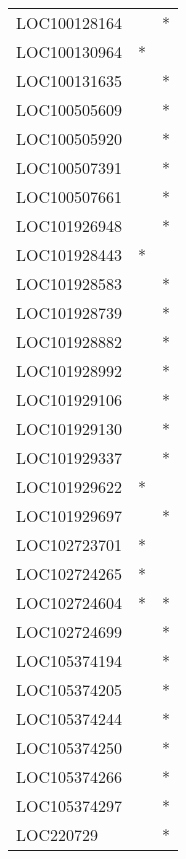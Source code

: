 \begin{longtable}{lcc}
LOC100128164     &                &          * \\
LOC100130964     &              * &            \\
LOC100131635     &                &          * \\
LOC100505609     &                &          * \\
LOC100505920     &                &          * \\
LOC100507391     &                &          * \\
LOC100507661     &                &          * \\
LOC101926948     &                &          * \\
LOC101928443     &              * &            \\
LOC101928583     &                &          * \\
LOC101928739     &                &          * \\
LOC101928882     &                &          * \\
LOC101928992     &                &          * \\
LOC101929106     &                &          * \\
LOC101929130     &                &          * \\
LOC101929337     &                &          * \\
LOC101929622     &              * &            \\
LOC101929697     &                &          * \\
LOC102723701     &              * &            \\
LOC102724265     &              * &            \\
LOC102724604     &              * &          * \\
LOC102724699     &                &          * \\
LOC105374194     &                &          * \\
LOC105374205     &                &          * \\
LOC105374244     &                &          * \\
LOC105374250     &                &          * \\
LOC105374266     &                &          * \\
LOC105374297     &                &          * \\
LOC220729        &                &          * \\

\end{longtable}
